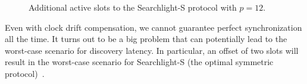 \documentclass[twoside,twocolumn]{article}
\begin{document}
\begin{figure}[t]\footnotesize
   \hfill
   \hfill
   \hfill
   \hfill
   \caption{Additional active slots to the Searchlight-S protocol with
      $p=12$.}
   \label{fig:searchlights}
\end{figure}

Even with clock drift compensation, we cannot guarantee perfect
synchronization all the time. It turns out to be a big problem that
can potentially lead to the worst-case scenario for discovery latency.
In particular, an offset of two slots will result in the
worst-case scenario for Searchlight-S (the optimal symmetric
protocol)~\citep{sun14hello}.
\end{document}
